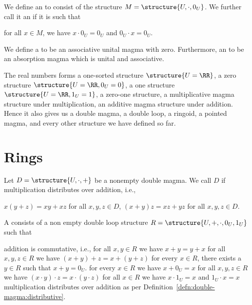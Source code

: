 \begin{definition}
We define an  to consist of the structure
$M=\structure{U,\cdot,0_{U}}$. We further call it an 
if it is such that
\begin{itemize}
 for all $x\in M$, we have
  $x\cdot0_{U}=0_{U}$ and $0_{U}\cdot x=0_{U}$.
\end{itemize}
We define a  to be an associative unital
magma with zero. Furthermore, an  to be an
absorption magma which is unital and associative.
\end{definition}

\begin{example}
The real numbers forms a one-sorted structure $\structure{U=\RR}$,
a zero structure $\structure{U=\RR,0_{U}=0}$, a one structure
$\structure{U=\RR,1_{U}=1}$, a zero-one structure, a multiplicative magma
structure under multiplication, an additive magma structure under
addition. Hence it also gives us a double magma, a double loop, a ringoid,
a pointed magma, and every other structure we have defined so far.
\end{example}

\section{Rings}

\begin{definition}\label{defn:double-magma:distributive}
Let $D=\structure{U,\cdot,+}$ be a nonempty double magma. We call $D$
 if multiplication distributes over addition,
i.e.,
\begin{itemize}
 $x(y+z)=xy+xz$ for all $x,y,z\in D$,
 $(x+y)z=xz+yz$ for all $x,y,z\in D$.
\end{itemize}
\end{definition}

\begin{definition}
A  consists of a non empty double loop structure
$R=\structure{U,+,\cdot,0_{U},1_{U}}$ such that
\begin{itemize}
 addition is commutative, i.e., for all $x,y\in R$
  we have $x + y = y + x$
 for all $x,y,z\in R$ we have
  $(x+y)+z=x+(y+z)$
 for every $x\in R$, there exists a
  $y\in R$ such that $x + y = 0_{U}$.
 for every $x\in R$ we have $x + 0_{U} = x$
 for all $x,y,z\in R$
  we have $(x\cdot y)\cdot z=x\cdot(y\cdot z)$
 for all $x\in R$ we have $x\cdot 1_{U}=x$ and
  $1_{U}\cdot x = x$
 multiplication distributes over addition as
  per Definition~\ref{defn:double-magma:distributive}.
\end{itemize}
\end{definition}

